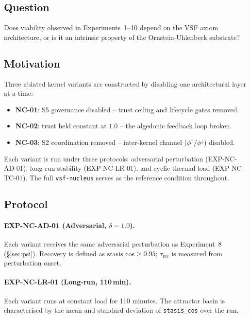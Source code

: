 \documentclass[11pt, a4paper]{article}
\newcommand{\nucleus}{\texttt{vsf-nucleus}}
\begin{document}
\subsection*{Question}
Does viability observed in Experiments~1--10 depend on the VSF axiom architecture,
or is it an intrinsic property of the Ornstein-Uhlenbeck substrate?

\subsection{Motivation}

Three ablated kernel variants are constructed by disabling one architectural
layer at a time:
\begin{itemize}
  \item \textbf{NC-01}: S5 governance disabled -- trust ceiling and lifecycle
        gates removed.
  \item \textbf{NC-02}: trust held constant at $1.0$ -- the algedonic feedback
        loop broken.
  \item \textbf{NC-03}: S2 coordination removed -- inter-kernel channel
        ($\phi^\uparrow / \phi^\downarrow$) disabled.
\end{itemize}
Each variant is run under three protocols: adversarial perturbation
(EXP-NC-AD-01), long-run stability (EXP-NC-LR-01), and cyclic thermal load
(EXP-NC-TC-01).
The full \nucleus{} serves as the reference condition throughout.

\subsection{Protocol}

\paragraph{EXP-NC-AD-01 (Adversarial, $\delta = 1.0$).}
Each variant receives the same adversarial perturbation as Experiment~8
(\S\ref{sec:psi}).
Recovery is defined as $\text{stasis\_cos} \geq 0.95$;
$\tau_\text{rec}$ is measured from perturbation onset.

\paragraph{EXP-NC-LR-01 (Long-run, 110\,min).}
Each variant runs at constant load for 110 minutes.
The attractor basin is characterised by the mean and standard deviation of
\texttt{stasis\_cos} over the run.
\end{document}
